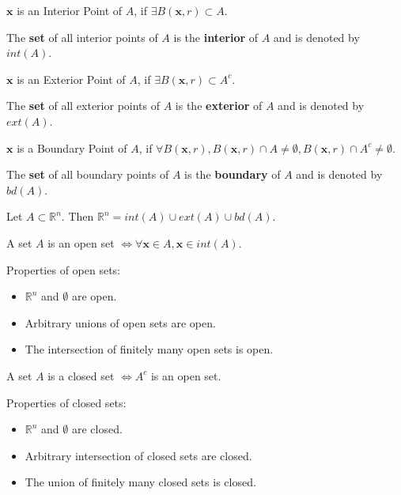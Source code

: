 \begin{definition}
    $\mathbf{x}$ is an Interior Point of $A$, if $\exists B(\mathbf{x},r) \subset A$.

    The \textbf{set} of all interior points of $A$ is the \textbf{interior} of $A$ and is denoted by $int(A)$.
\end{definition}

\begin{definition}
    $\mathbf{x}$ is an Exterior Point of $A$, if $\exists B(\mathbf{x},r) \subset A^{c}$.

    The \textbf{set} of all exterior points of $A$ is the \textbf{exterior} of $A$ and is denoted by $ext(A)$.
\end{definition}

\begin{definition}
    $\mathbf{x}$ is a Boundary Point of $A$, if $\forall B(\mathbf{x},r), B(\mathbf{x},r)\cap A \neq \emptyset,  B(\mathbf{x},r)\cap A^c \neq \emptyset$.

    The \textbf{set} of all boundary points of $A$ is the \textbf{boundary} of $A$ and is denoted by $bd(A)$.
\end{definition}

\begin{remark*}
    Let $A \subset \mathbb{R}^{n}$. Then $\mathbb{R}^{n}=int(A)\cup ext(A)\cup bd(A)$.
\end{remark*}

\begin{definition}
    A set $A$ is an open set $\iff \forall \mathbf{x} \in A, \mathbf{x} \in int(A)$.
\end{definition}
Properties of open sets:
\begin{itemize}
    \item $\mathbb{R}^{n}$ and $\emptyset $ are open.
    \item Arbitrary unions of open sets are open.
    \item The intersection of finitely many open sets is open.
\end{itemize}

\begin{definition}
    A set $A$ is a closed set $\iff A^c$ is an open set.
\end{definition}
Properties of closed sets:
\begin{itemize}
    \item $\mathbb{R}^{n}$ and $\emptyset $ are closed.
    \item Arbitrary intersection of closed sets are closed.
    \item The union of finitely many closed sets is closed.
\end{itemize}


